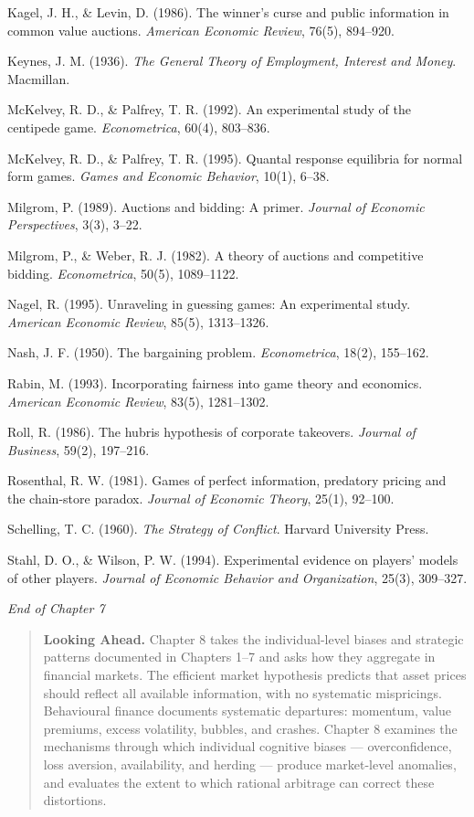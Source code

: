 \documentclass[12pt, letterpaper]{article}
\begin{document}
Kagel, J. H., \& Levin, D. (1986). The winner's curse and public information in common value auctions. \textit{American Economic Review}, 76(5), 894--920.

Keynes, J. M. (1936). \textit{The General Theory of Employment, Interest and Money}. Macmillan.

McKelvey, R. D., \& Palfrey, T. R. (1992). An experimental study of the centipede game. \textit{Econometrica}, 60(4), 803--836.

McKelvey, R. D., \& Palfrey, T. R. (1995). Quantal response equilibria for normal form games. \textit{Games and Economic Behavior}, 10(1), 6--38.

Milgrom, P. (1989). Auctions and bidding: A primer. \textit{Journal of Economic Perspectives}, 3(3), 3--22.

Milgrom, P., \& Weber, R. J. (1982). A theory of auctions and competitive bidding. \textit{Econometrica}, 50(5), 1089--1122.

Nagel, R. (1995). Unraveling in guessing games: An experimental study. \textit{American Economic Review}, 85(5), 1313--1326.

Nash, J. F. (1950). The bargaining problem. \textit{Econometrica}, 18(2), 155--162.

Rabin, M. (1993). Incorporating fairness into game theory and economics. \textit{American Economic Review}, 83(5), 1281--1302.

Roll, R. (1986). The hubris hypothesis of corporate takeovers. \textit{Journal of Business}, 59(2), 197--216.

Rosenthal, R. W. (1981). Games of perfect information, predatory pricing and the chain-store paradox. \textit{Journal of Economic Theory}, 25(1), 92--100.

Schelling, T. C. (1960). \textit{The Strategy of Conflict}. Harvard University Press.

Stahl, D. O., \& Wilson, P. W. (1994). Experimental evidence on players' models of other players. \textit{Journal of Economic Behavior and Organization}, 25(3), 309--327.

\medskip

\textit{End of Chapter 7}

\medskip

\begin{quote}
\textbf{Looking Ahead.} Chapter 8 takes the individual-level biases and strategic patterns documented in Chapters 1--7 and asks how they aggregate in financial markets. The efficient market hypothesis predicts that asset prices should reflect all available information, with no systematic mispricings. Behavioural finance documents systematic departures: momentum, value premiums, excess volatility, bubbles, and crashes. Chapter 8 examines the mechanisms through which individual cognitive biases --- overconfidence, loss aversion, availability, and herding --- produce market-level anomalies, and evaluates the extent to which rational arbitrage can correct these distortions.
\end{quote}
\end{document}
